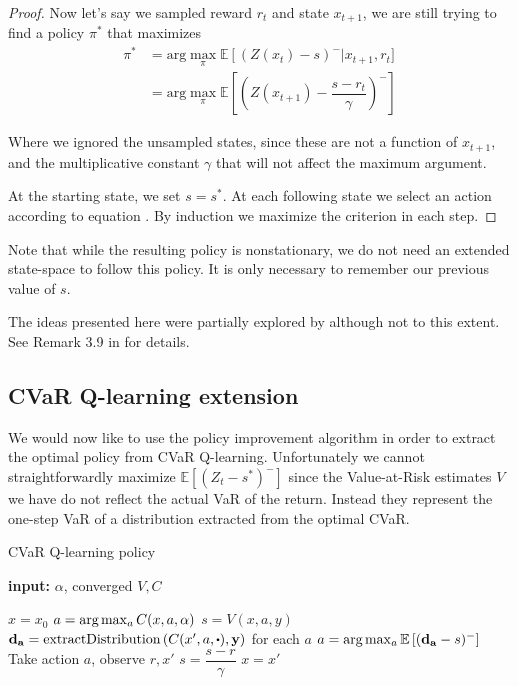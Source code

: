 \begin{proof}
Now let's say we sampled reward $r_t$ and state $x_{t+1}$, we are still trying to find a policy $\pi^*$ that maximizes 
\begin{equation}\label{eqn:sampled x_t+1}
\begin{split}
\pi^* &=\text{arg}\max_\pi \mathbb{E}\left[(Z(x_t)-s)^-\right | x_{t+1}, r_t]\\
&= \text{arg}\max_\pi \mathbb{E}\left[\left(Z(x_{t+1}) - \dfrac{s - r_t}{\gamma}\right)^-\right]
\end{split}
\end{equation}

Where we ignored the unsampled states, since these are not a function of $x_{t+1}$, and the multiplicative constant $\gamma$ that will not affect the maximum argument.

At the starting state, we set $s=s^*$. At each following state we select an action according to equation . By induction we maximize the criterion  in each step.
\end{proof}

Note that while the resulting policy is nonstationary, we do not need an extended state-space to follow this policy. It is only necessary to remember our previous value of $s$.

The ideas presented here were partially explored by \citet{bauerle2011markov} although not to this extent. See Remark 3.9 in \citep{bauerle2011markov} for details.

\subsection{CVaR Q-learning extension}
We would now like to use the policy improvement algorithm in order to extract the optimal policy from CVaR Q-learning. Unfortunately we cannot straightforwardly maximize $\mathbb{E}\left[(Z_t-s^*)^-\right]$ since the Value-at-Risk estimates $V$ we have do not reflect the actual VaR of the return. Instead they represent the one-step VaR of a distribution extracted from the optimal CVaR.


\begin{algorithm}
\caption{CVaR Q-learning policy}\label{alg:varbasedpolicy}
\begin{algorithmic}
    \STATE \textbf{input:} $\alpha$, converged $V, C$
    		
	\STATE $x = x_0$
	\STATE $a = \text{arg}\max_a C(x, a, \alpha)$
	\STATE $s = V(x, a, y)$
	\STATE $\mathbf{d_a} = \text{extractDistribution}\bround{C(x', a, \bigcdot), \mathbf{y}}$ for each $a$
	\STATE $a = \text{arg}\max_a \mathbb{E}\left[(\mathbf{d_a}-s)^-\right]$
	\STATE Take action $a$, observe $r, x'$
	\STATE $s = \dfrac{s-r}{\gamma}$
	\STATE $x = x'$
	\ENDWHILE
\end{algorithmic}
\end{algorithm}



